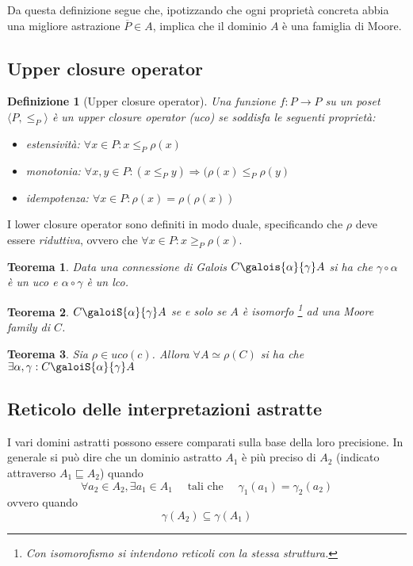 \documentclass[a4paper, 11pt]{article}
\newtheorem{definit}{Definizione}[subsection]
\newtheorem{thm}{Teorema}[subsection]
\begin{document}
	Da questa definizione segue che, ipotizzando che ogni proprietà concreta abbia una migliore astrazione $\overline{P} \in A$, implica che il dominio $A$ è una famiglia di Moore.
	
	\subsection{Upper closure operator}
	\begin{definit}[Upper closure operator]
		Una funzione $f:P \to P$ su un poset $\langle P, \leq_P \rangle $ è un upper closure operator (uco) se soddisfa le seguenti proprietà:\begin{itemize}
			\item estensività: $\forall x \in P: x \leq_P \rho(x)$
			\item monotonia: $\forall x,y \in P: (x \leq_P y) \Rightarrow (\rho(x) \leq_P \rho(y)$
			\item idempotenza: $\forall x \in P: \rho(x) = \rho(\rho(x))$
		\end{itemize}
	\end{definit}

	I lower closure operator sono definiti in modo duale, specificando che $\rho$ deve essere \textit{riduttiva}, ovvero che $\forall x \in P: x \geq_P \rho(x)$.
	
	\begin{thm}
		Data una connessione di Galois $C \galois{\alpha}{\gamma} A$ si ha che $\gamma \circ \alpha$ è un uco e $\alpha \circ \gamma $ è un lco.
	\end{thm}
	\begin{thm}
		$C \galoiS{\alpha}{\gamma} A$ se e solo se $A$ è isomorfo \footnote{Con isomorofismo si intendono reticoli con la stessa struttura.} ad una Moore family di $C$.
	\end{thm}
	\begin{thm}
		Sia $\rho \in uco(c)$. Allora $\forall A \simeq \rho(C)$ si ha che $\exists \alpha, \gamma : C \galoiS{\alpha}{\gamma} A$
	\end{thm}
	
	\subsection{Reticolo delle interpretazioni astratte}
	I vari domini astratti possono essere comparati sulla base della loro precisione. In generale si può dire che un dominio astratto $A_1$ è più preciso di $A_2$ (indicato attraverso $A_1 \sqsubseteq A_2$) quando \[ \forall a_2 \in A_2, \exists a_1 \in A_1 \quad \text{ tali che } \quad \gamma_1(a_1) = \gamma_2(a_2) \] ovvero quando \[ \gamma(A_2) \subseteq \gamma(A_1) \]
	
\end{document}
